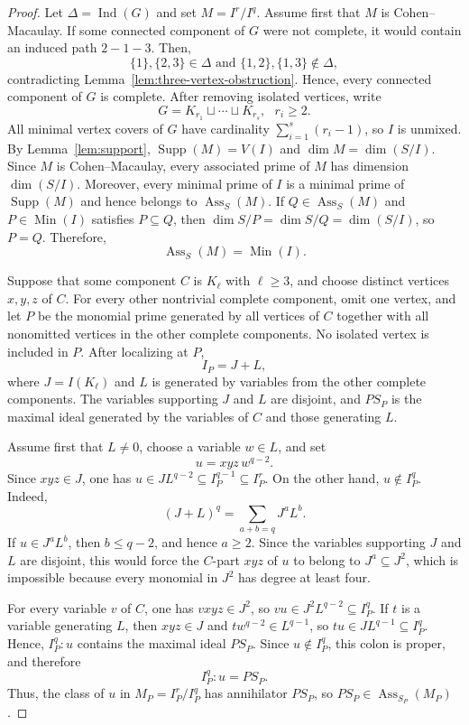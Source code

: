 \documentclass[10pt,a4paper]{amsart}
\begin{document}
\begin{proof}
Let $\Delta=\operatorname{Ind}(G)$ and set $M=I^r/I^q$. Assume first that
$M$ is Cohen--Macaulay. If some connected component of $G$ were not complete,
it would contain an induced path $2-1-3$. Then,
$$
\{1\},\{2,3\}\in\Delta
\text{ and }
\{1,2\},\{1,3\}\notin\Delta,
$$
contradicting Lemma~\ref{lem:three-vertex-obstruction}. Hence, every connected
component of $G$ is complete. After removing isolated vertices, write
$$
G=K_{r_1}\sqcup\cdots\sqcup K_{r_s},\text{ } r_i\ge2.
$$
All minimal vertex covers of $G$ have cardinality
$\sum_{i=1}^s(r_i-1)$, so $I$ is unmixed. By Lemma~\ref{lem:support},
$\operatorname{Supp}(M)=V(I)$ and $\dim M=\dim(S/I)$. Since $M$ is
Cohen--Macaulay, every associated prime of $M$ has dimension $\dim(S/I)$.
Moreover, every minimal prime of $I$ is a minimal prime of
$\operatorname{Supp}(M)$ and hence belongs to $\operatorname{Ass}_S(M)$.
If $Q\in\operatorname{Ass}_S(M)$ and $P\in\operatorname{Min}(I)$ satisfies
$P\subseteq Q$, then $\dim S/P=\dim S/Q=\dim(S/I)$, so $P=Q$. Therefore,
$$
\operatorname{Ass}_S(M)=\operatorname{Min}(I).
$$

Suppose that some component $C$ is $K_\ell$ with $\ell\ge3$, and choose
distinct vertices $x,y,z$ of $C$. For every other nontrivial complete component, omit
one vertex, and let $P$ be the monomial prime generated by all vertices of
$C$ together with all nonomitted vertices in the other complete components.
No isolated vertex is included in $P$. After localizing at $P$,
$$
I_P=J+L,
$$
where $J=I(K_\ell)$ and $L$ is generated by variables from the other complete
components. The variables supporting $J$ and $L$ are disjoint, and $PS_P$ is
the maximal ideal generated by the variables of $C$ and those generating $L$.

Assume first that $L\neq0$, choose a variable $w\in L$, and set
$$
u=xyz\,w^{q-2}.
$$
Since $xyz\in J$, one has
$u\in JL^{q-2}\subseteq I_P^{q-1}\subseteq I_P^r$. On the other hand,
$u\notin I_P^q$. Indeed,
$$
(J+L)^q=\sum_{a+b=q}J^aL^b.
$$
If $u\in J^aL^b$, then $b\le q-2$, and hence $a\ge2$. Since the
variables supporting $J$ and $L$ are disjoint, this would force the $C$-part
$xyz$ of $u$ to belong to $J^a\subseteq J^2$, which is impossible because
every monomial in $J^2$ has degree at least four.

For every variable $v$ of $C$, one has $vxyz\in J^2$, so
$vu\in J^2L^{q-2}\subseteq I_P^q$. If $t$ is a variable generating $L$,
then $xyz\in J$ and $tw^{q-2}\in L^{q-1}$, so
$tu\in JL^{q-1}\subseteq I_P^q$. Hence,
$I_P^q:u$ contains the maximal ideal $PS_P$. Since $u\notin I_P^q$, this
colon is proper, and therefore
$$
I_P^q:u=PS_P.
$$
Thus, the class of $u$ in $M_P=I_P^r/I_P^q$ has annihilator $PS_P$, so
$PS_P\in\operatorname{Ass}_{S_P}(M_P)$.


\end{proof}
\end{document}

